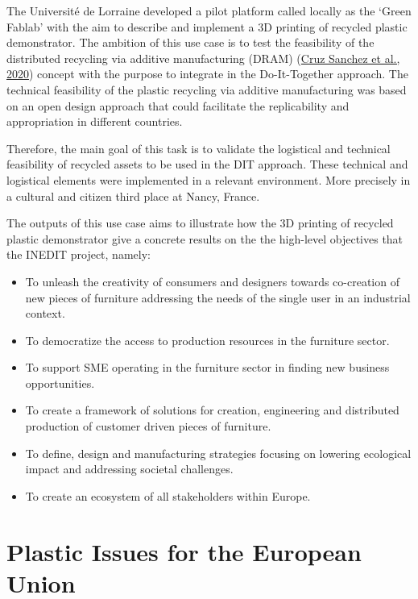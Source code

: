 \documentclass[
  11pt,
]{article}
\providecommand{\tightlist}{%
  \setlength{\itemsep}{0pt}\setlength{\parskip}{0pt}}\usepackage{longtable,booktabs,array}
\begin{document}
The Université de Lorraine developed a pilot platform called locally as
the `Green Fablab' with the aim to describe and implement a 3D printing
of recycled plastic demonstrator. The ambition of this use case is to
test the feasibility of the distributed recycling via additive
manufacturing (DRAM) (\protect\hyperlink{ref-CruzSanchez2020}{Cruz
Sanchez et al., 2020}) concept with the purpose to integrate in the
Do-It-Together approach. The technical feasibility of the plastic
recycling via additive manufacturing was based on an open design
approach that could facilitate the replicability and appropriation in
different countries.

Therefore, the main goal of this task is to validate the logistical and
technical feasibility of recycled assets to be used in the DIT approach.
These technical and logistical elements were implemented in a relevant
environment. More precisely in a cultural and citizen third place at
Nancy, France.

The outputs of this use case aims to illustrate how the 3D printing of
recycled plastic demonstrator give a concrete results on the the
high-level objectives that the INEDIT project, namely:

\begin{itemize}
\tightlist
\item
  To unleash the creativity of consumers and designers towards
  co-creation of new pieces of furniture addressing the needs of the
  single user in an industrial context.
\item
  To democratize the access to production resources in the furniture
  sector.
\item
  To support SME operating in the furniture sector in finding new
  business opportunities.
\item
  To create a framework of solutions for creation, engineering and
  distributed production of customer driven pieces of furniture.
\item
  To define, design and manufacturing strategies focusing on lowering
  ecological impact and addressing societal challenges.
\item
  To create an ecosystem of all stakeholders within Europe.
\end{itemize}

\newpage

\hypertarget{sec-plastic}{%
\section{Plastic Issues for the European Union}\label{sec-plastic}}
\end{document}
